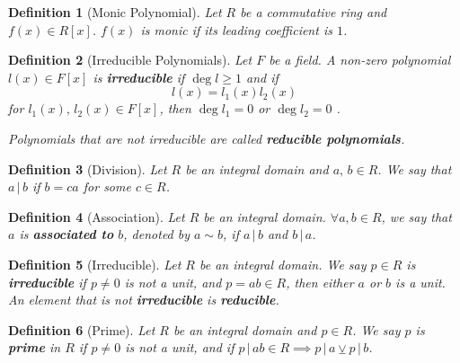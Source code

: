 \documentclass[9pt,landscape,a4paper]{article}
\newcommand{\hldefn}[1]{\textcolor{base16-eighties-magenta}{\textbf{#1}}}
\newcommand{\hlnoteb}[1]{\textcolor{base16-eighties-magenta}{\textbf{#1}}}
\theoremstyle{empty}
\newtheorem{defn}{Definition}
\begin{document}
\begin{multicols*}{5}
\begin{defn}[Monic Polynomial]
\label{defn:monic_polynomial}
  Let $R$ be a commutative ring and $f(x) \in R[x]$. $f(x)$ is monic if its leading coefficient is $1$.
\end{defn}

\begin{defn}[Irreducible Polynomials]
\label{defn:irreducible_polynomials}
  Let $F$ be a field. A non-zero polynomial $l(x) \in F[x]$ is \hlnoteb{irreducible} if $\deg l \geq 1$ and if
  \begin{equation*}
    l(x) = l_1 (x) l_2 (x)
  \end{equation*}
  for $l_1(x), \, l_2 (x) \in F[x]$, then $\deg l_1 = 0$ or $\deg l_2 = 0$ .

  Polynomials that are not irreducible are called \hldefn{reducible polynomials}.
\end{defn}

\begin{defn}[Division]
\label{defn:division}
  Let $R$ be an integral domain and $a, \, b \in R$. We say that $a \, | \, b$ if $b = ca$ for some $c \in R$.
\end{defn}

\begin{defn}[Association]
\label{defn:association}
  Let $R$ be an integral domain. $\forall a, b \in R$, we say that $a$ is \hldefn{associated to} $b$, denoted by $a \sim b$, if $a \, | \, b$ and $b \, | \, a$.
\end{defn}

\begin{defn}[Irreducible]
\label{defn:irreducible}
  Let $R$ be an integral domain. We say $p \in R$ is \hlnoteb{irreducible} if $p \neq 0$ is not a unit, and $p = ab \in R$, then either $a$ or $b$ is a unit. An element that is not \hlnoteb{irreducible} is \hlnoteb{reducible}.
\end{defn}

\begin{defn}[Prime]
\label{defn:prime}
  Let $R$ be an integral domain and $p \in R$. We say $p$ is \hlnoteb{prime} in $R$ if $p \neq 0$ is not a unit, and if $p \, | \, ab \in R \implies p \, | \, a \veebar p \, | \, b$.
\end{defn}


\end{multicols*}
\end{document}
